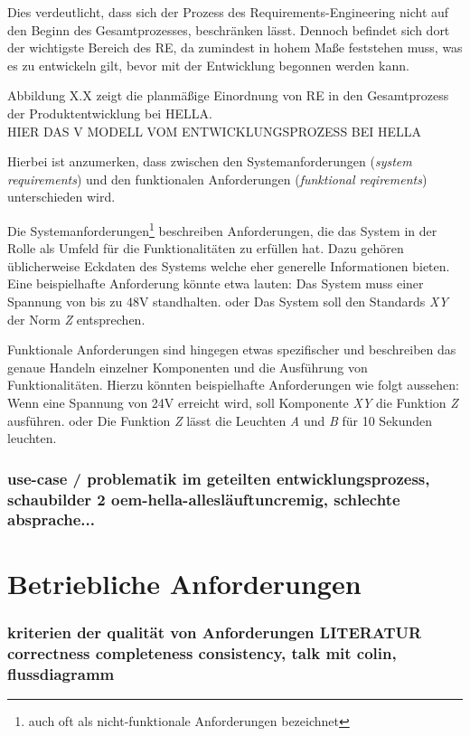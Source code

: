 \documentclass[12pt]{report}
\begin{document}
Dies verdeutlicht, dass sich der Prozess des Requirements-Engineering nicht auf den Beginn des Gesamtprozesses, beschränken lässt. Dennoch befindet sich dort der wichtigste Bereich des RE, da zumindest in hohem Maße feststehen muss, was es zu entwickeln gilt, bevor mit der Entwicklung begonnen werden kann.

Abbildung X.X zeigt die planmäßige Einordnung von RE in den Gesamtprozess der Produktentwicklung bei HELLA. 
\\
\newline
HIER DAS V MODELL VOM ENTWICKLUNGSPROZESS BEI HELLA
\\
\newline

Hierbei ist anzumerken, dass zwischen den Systemanforderungen (\textit{system requirements}) und den funktionalen Anforderungen (\textit{funktional reqirements}) unterschieden wird. 

Die Systemanforderungen\footnote{auch oft als nicht-funktionale Anforderungen bezeichnet} beschreiben Anforderungen, die das System in der Rolle als Umfeld für die Funktionalitäten zu erfüllen hat. Dazu gehören üblicherweise Eckdaten des Systems welche eher generelle Informationen bieten. Eine beispielhafte Anforderung könnte etwa lauten: \glqq Das System muss einer Spannung von bis zu 48V standhalten.\grqq{} oder \glqq Das System soll den Standards \textit{XY} der Norm \textit{Z} entsprechen.\grqq

Funktionale Anforderungen sind hingegen etwas spezifischer und beschreiben das genaue Handeln einzelner Komponenten und die Ausführung von Funktionalitäten. Hierzu könnten beispielhafte Anforderungen wie folgt aussehen: \glqq Wenn eine Spannung von 24V erreicht wird, soll Komponente \textit{XY} die Funktion \textit{Z} ausführen.\grqq{} oder \glqq Die Funktion \textit{Z} lässt die Leuchten \textit{A} und \textit{B} für 10 Sekunden leuchten.\grqq

\subsubsection{use-case / problematik im geteilten entwicklungsprozess, schaubilder 2 oem-hella-allesläuftuncremig, schlechte absprache...}
\section{Betriebliche Anforderungen}
\subsubsection{kriterien der qualität von Anforderungen LITERATUR correctness completeness consistency, talk mit colin, flussdiagramm}
\end{document}
